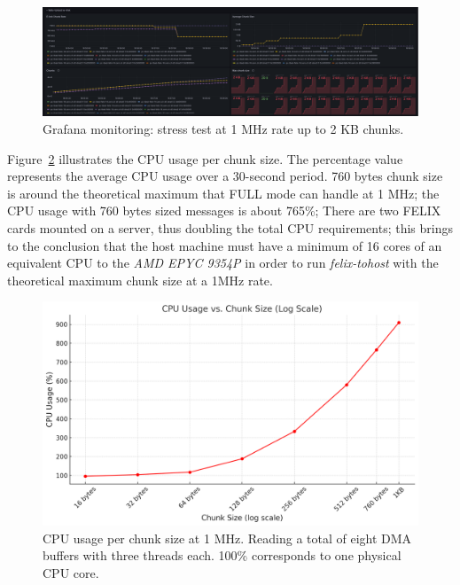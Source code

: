 \begin{figure}[htbp]
\centering
\includegraphics[width=\textwidth]{images/results/tohost-perf-2k.png}
\caption{Grafana monitoring: stress test at 1 MHz rate up to 2 KB chunks.}
\label{fig:tohost-perf-2k}
\end{figure}

Figure~\ref{fig:cpu-usage} illustrates the CPU usage per chunk size. The percentage value represents the average CPU usage over a 30-second period. 760 bytes chunk size is around the theoretical maximum that FULL mode can handle at 1 MHz; the CPU usage with 760 bytes sized messages is about 765\%; There are two \acs{FELIX} cards mounted on a server, thus doubling the total CPU requirements; this brings to the conclusion that the host machine must have a minimum of 16 cores of an equivalent CPU to the \emph{AMD EPYC 9354P} in order to run \emph{felix-tohost} with the theoretical maximum chunk size at a 1MHz rate.

\begin{figure}[htbp]
\centering
\includegraphics[width=\textwidth]{images/results/cpu-usage-chunk-size-1MHz.png}
\caption[CPU usage per chunk size at 1 MHz]{CPU usage per chunk size at 1 MHz. Reading a total of eight DMA buffers with three threads each. 100\% corresponds to one physical CPU core.}
\label{fig:cpu-usage}
\end{figure}

